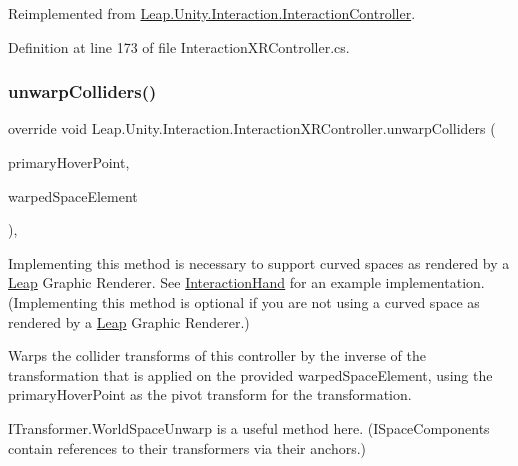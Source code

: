 Reimplemented from \mbox{\hyperlink{class_leap_1_1_unity_1_1_interaction_1_1_interaction_controller_a697f206b8e73d177c203b3ca12874cb6}{Leap.\+Unity.\+Interaction.\+Interaction\+Controller}}.



Definition at line 173 of file Interaction\+X\+R\+Controller.\+cs.

\mbox{\label{class_leap_1_1_unity_1_1_interaction_1_1_interaction_x_r_controller_aae371c99d08f9ce6e8850e36109690c5}} 
\subsubsection{\texorpdfstring{unwarpColliders()}{unwarpColliders()}}
{\footnotesize\ttfamily override void Leap.\+Unity.\+Interaction.\+Interaction\+X\+R\+Controller.\+unwarp\+Colliders (\begin{DoxyParamCaption}\item[{Transform}]{primary\+Hover\+Point,  }\item[{\mbox{\hyperlink{interface_leap_1_1_unity_1_1_space_1_1_i_space_component}{I\+Space\+Component}}}]{warped\+Space\+Element }\end{DoxyParamCaption})\hspace{0.3cm}{\ttfamily [protected]}, {\ttfamily [virtual]}}



Implementing this method is necessary to support curved spaces as rendered by a \mbox{\hyperlink{namespace_leap_1_1_unity_1_1_leap}{Leap}} Graphic Renderer. See \mbox{\hyperlink{class_leap_1_1_unity_1_1_interaction_1_1_interaction_hand}{Interaction\+Hand}} for an example implementation. (Implementing this method is optional if you are not using a curved space as rendered by a \mbox{\hyperlink{namespace_leap_1_1_unity_1_1_leap}{Leap}} Graphic Renderer.) 

Warps the collider transforms of this controller by the inverse of the transformation that is applied on the provided warped\+Space\+Element, using the primary\+Hover\+Point as the pivot transform for the transformation.

I\+Transformer.\+World\+Space\+Unwarp is a useful method here. (I\+Space\+Components contain references to their transformers via their anchors.)

